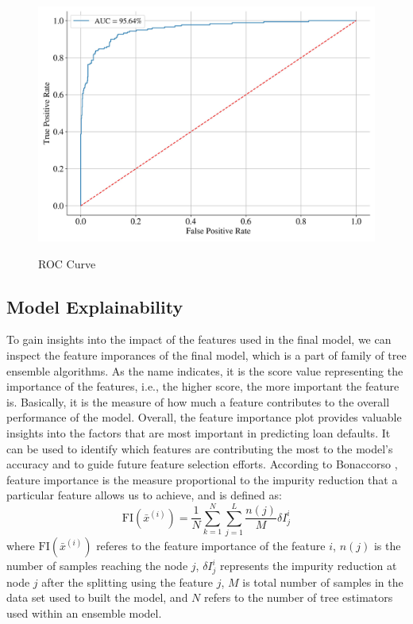 \begin{figure}[H]
\centering
\caption{ROC Curve}\vspace{0.5em}
\label{fig:roc}\
\includegraphics[width=140mm]{Figures/ROC_curve_FINAL.jpg}
\vspace{-1em}
\end{figure}

\subsection{Model Explainability}
To gain insights into the impact of the features used in the final model, we can inspect the feature imporances of the final model, which is a part of family of tree ensemble algorithms.
As the name indicates, it is the score value representing the importance of the features, i.e., the higher score, the more important the feature is. Basically, it is the measure of how much a feature contributes to the overall performance of the model.
Overall, the feature importance plot provides valuable insights into the factors that are most important in predicting loan defaults. It can be used to identify which features are contributing the most to the model's accuracy and to guide future feature selection efforts.
According to Bonaccorso \citep{bonaccorso2020mastering}, feature importance is the measure proportional to the impurity reduction that a particular feature allows us to achieve, and is defined as:
\begin{equation}\label{eq}
    \text{FI}\left(\bar{x}^{\left(i\right)}\right) = \frac{1}{N} \displaystyle\sum_{k=1}^{N} \displaystyle\sum_{j=1}^{L} \frac{n(j)}{M} \delta I_{j}^{i}
\end{equation}
where $ \text{FI}\left(\bar{x}^{\left(i\right)}\right)$ referes to the feature importance of the feature $i$, $n(j)$ is the number of samples reaching the node $j$, $\delta I_{j}^{i}$ represents the impurity reduction at node $j$ after the splitting using the feature $j$, $M$ is total number of samples in the data set used to built the model, and $N$ refers to the number of tree estimators used within an ensemble model.

